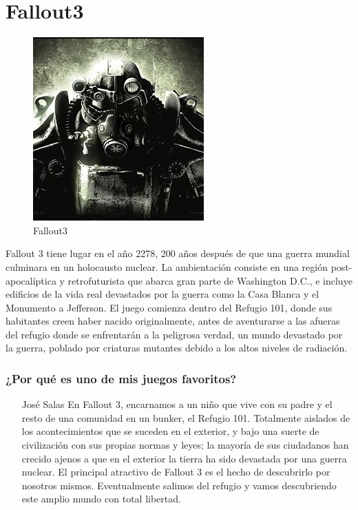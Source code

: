 \section{Fallout3}

\begin{figure}[htbp]
\begin{center}
\includegraphics[width=.40\textwidth]{./imagenes/fallout3.jpg}
\caption{Fallout3}
\label{Fallout3}
\end{center}
\end{figure}
Fallout 3 tiene lugar en el año 2278, 200 años después de que una guerra mundial culminara en un holocausto nuclear. La ambientación consiste en una región post-apocalíptica y retrofuturista que abarca gran parte de Washington D.C., e  incluye edificios de la vida real devastados por la guerra como la Casa Blanca y el Monumento a Jefferson. El juego comienza dentro del Refugio 101, donde sus habitantes creen haber nacido originalmente, antes de aventurarse a las afueras del refugio donde se enfrentarán a la peligrosa verdad, un mundo devastado por la guerra, poblado por criaturas mutantes debido a los altos niveles de radiación.  

\subsubsection{¿Por qué es uno de mis juegos favoritos?}
\begin{itemize}
\item[José Salas] En Fallout 3, encarnamos a un niño que vive con su padre y el resto de una comunidad en un bunker, el Refugio 101. Totalmente aislados de los acontecimientos que se suceden en el exterior, y bajo una suerte de civilización con sus propias normas y leyes; la mayoría de sus ciudadanos han crecido ajenos a que en el exterior la tierra ha sido devastada por una guerra nuclear. El principal atractivo de Fallout 3 es el hecho de descubrirlo por nosotros mismos. Eventualmente salimos del refugio y vamos descubriendo este amplio mundo con total libertad.

\end{itemize}